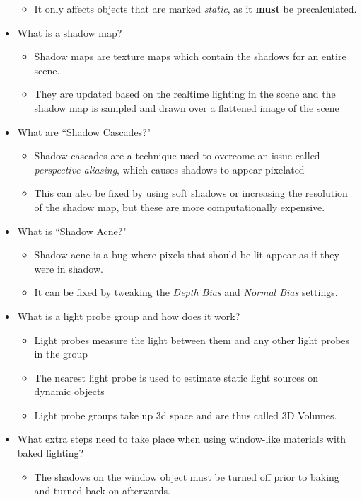 \documentclass{article}
\begin{document}
\begin{itemize}
\begin{itemize}
        \item It only affects objects that are marked \textit{static}, as it \textbf{must} be precalculated.
    \end{itemize}
    \item What is a shadow map?
    \begin{itemize}
        \item Shadow maps are texture maps which contain the shadows for an entire scene. 
        \item They are updated based on the realtime lighting in the scene and the shadow map is sampled and drawn over a flattened image of the scene 
    \end{itemize}
    \item What are ``Shadow Cascades?"
    \begin{itemize}
        \item Shadow cascades are a technique used to overcome an issue called \textit{perspective aliasing}, which causes shadows to appear pixelated
        \item This can also be fixed by using soft shadows or increasing the resolution of the shadow map, but these are more computationally expensive.
    \end{itemize}
    \item What is ``Shadow Acne?"
    \begin{itemize}
        \item Shadow acne is a bug where pixels that should be lit appear as if they were in shadow.
        \item It can be fixed by tweaking the \textit{Depth Bias} and \textit{Normal Bias} settings.
    \end{itemize}
    \item What is a light probe group and how does it work?
    \begin{itemize}
        \item Light probes measure the light between them and any other light probes in the group
        \item The nearest light probe is used to estimate static light sources on dynamic objects
        \item Light probe groups take up 3d space and are thus called 3D Volumes.
    \end{itemize}
    \item What extra steps need to take place when using window-like materials with baked lighting?
    \begin{itemize}
        \item The shadows on the window object must be turned off prior to baking and turned back on afterwards.

\end{itemize}
\end{itemize}
\end{document}
